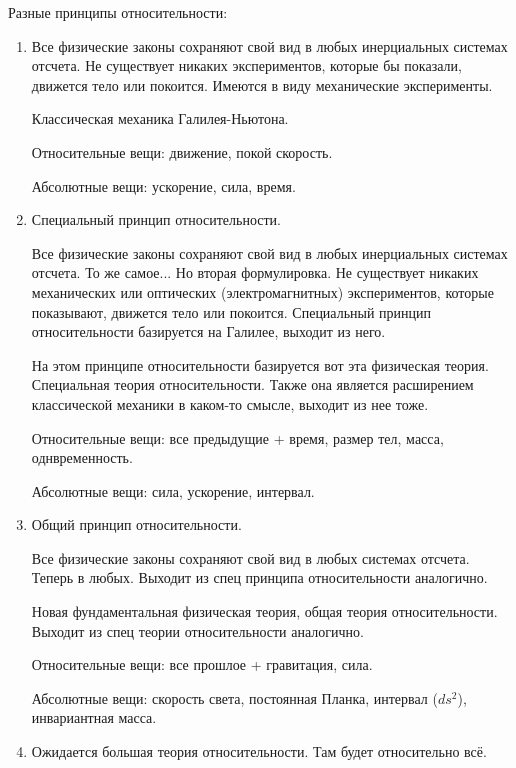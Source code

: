 \documentclass[a4paper, 12pt]{article}
\begin{document}
Разные принципы относительности:
\begin{enumerate}
  \item Все физические законы сохраняют свой вид в любых инерциальных 
    системах отсчета. Не существует никаких экспериментов, которые бы 
    показали, движется тело или покоится. Имеются в виду механические 
    эксперименты.

    Классическая механика Галилея-Ньютона.

    Относительные вещи: движение, покой скорость.

    Абсолютные вещи: ускорение, сила, время.

  \item Специальный принцип относительности.

    Все физические законы сохраняют свой вид в любых инерциальных 
    системах отсчета. То же самое... Но вторая формулировка. Не 
    существует никаких механических или оптических (электромагнитных) 
    экспериментов, которые показывают, движется тело или покоится. 
    Специальный принцип относительности базируется на Галилее, выходит 
    из него.

    На этом принципе относительности базируется вот эта физическая 
    теория. Специальная теория относительности. Также она является 
    расширением классической механики в каком-то смысле, выходит из нее 
    тоже.

    Относительные вещи: все предыдущие + время, размер тел, масса, 
    однвременность.

    Абсолютные вещи: сила, ускорение, интервал.

  \item Общий принцип относительности.

    Все физические законы сохраняют свой вид в любых системах отсчета. 
    Теперь в любых. Выходит из спец принципа относительности аналогично.

    Новая фундаментальная физическая теория, общая теория 
    относительности. Выходит из спец теории относительности аналогично.

    Относительные вещи: все прошлое + гравитация, сила.

    Абсолютные вещи: скорость света, постоянная Планка, интервал ($ds^2$), 
    инвариантная масса.

  \item Ожидается большая теория относительности. Там будет относительно 
    всё.
\end{enumerate}
\end{document}

